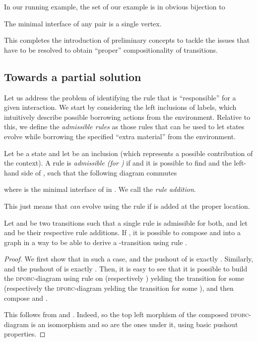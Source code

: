 \begin{example}
  In our running example, 
  the set  of our example is in obvious bijection to
     
  The minimal interface of any pair is a single vertex.
\end{example}
This completes the introduction of preliminary concepts to tackle the issues that 
have to be resolved to obtain ``proper'' compositionality of transitions. 

\subsection{Towards a partial solution}
Let us address the problem of identifying the rule that is ``responsible'' for a given interaction. 
We start by considering the left inclusions of labels, 
which intuitively describe possible borrowing actions from the environment.
Relative to this,  we define the \emph{admissible rules} as those rules that
can be used to let states evolve while borrowing the specified ``extra material'' from the environment.

\begin{definition}
  \label{def:admissibility}
  Let  be a state
  and let  be an inclusion (which represents a possible contribution of the context). 
  A rule  is \emph{admissible  (for )}  
  if  and it is possible to find  and  the left-hand side of , such that the following diagram commutes 

where  is the minimal interface of  in . 
We call  the \emph{rule addition}.

\end{definition}
This just means that  \emph{can} evolve using the rule  if   is added at the proper location. 



\begin{proposition}[Precompositionality]
   Let  and  be two transitions such that a single rule  is admissible  for both, and let  and  be their respective rule additions.
  If , 
  it is possible to compose  and  into a graph  in a way to be able to derive a
  -transition using rule .
\label{prop:compositionality}
\end{proposition}

\begin{proof}
  We first show that in such a case,  and the pushout of  is exactly . Similarly,  and the pushout of  is exactly .
  Then, it is easy to see that it is possible to build the
  \textsc{dpobc}-diagram   using rule   on 
  (respectively ) yelding the transition
   for some  (respectively the
  \textsc{dpobc}-diagram  yelding the transition
   for some ), and then compose
   and .









This follows from   and .
Indeed,  so the top left morphism of the composed \textsc{dpobc}-diagram is an isomorphism
and so are the ones under it, using basic pushout properties.
\end{proof}

